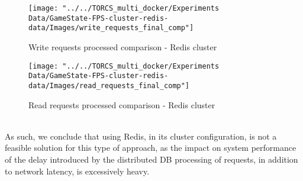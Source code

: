 \begin{figure}[h!]
	\centering
	\texttt{[image: "../../TORCS\_multi\_docker/Experiments Data/GameState-FPS-cluster-redis-data/Images/write\_requests\_final\_comp"]}
	\caption[Write requests processed comparison - Redis cluster]{Write requests processed comparison - Redis cluster}
	\label{fig:write-requests-comparison-redis-cluster}
\end{figure}
\begin{figure}[h!]
	\centering
	\texttt{[image: "../../TORCS\_multi\_docker/Experiments Data/GameState-FPS-cluster-redis-data/Images/read\_requests\_final\_comp"]}
	\caption[Read requests processed comparison - Redis cluster]{Read requests processed comparison - Redis cluster}
	\label{fig:read-requests-comparison-redis-cluster}
\end{figure}
\\ As such, we conclude that using Redis, in its cluster configuration, is not a feasible solution for this type of approach, as the impact on system performance of the delay introduced by the distributed DB processing of requests, in addition to network latency, is excessively heavy.

